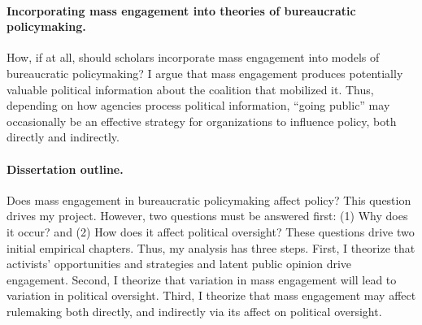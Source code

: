 \documentclass{article}
\begin{document}
\paragraph{Incorporating mass engagement into theories of bureaucratic policymaking.}
How, if at all, should scholars incorporate mass engagement into models of bureaucratic policymaking? 
I argue that mass engagement produces potentially valuable political information about the coalition that mobilized it.
Thus, depending on how agencies process political information, ``going public'' may occasionally be an effective strategy for organizations to influence policy, both directly and indirectly.

\paragraph{Dissertation outline.}
Does mass engagement in bureaucratic policymaking affect policy? This question drives my project. However, two questions must be answered first: (1) Why does it occur? and (2) How does it affect political oversight? These questions drive two initial empirical chapters. Thus, my analysis has three steps.
First, I theorize that activists' opportunities and strategies and latent public opinion drive engagement. Second, I theorize that variation in mass engagement will lead to variation in political oversight. Third, I theorize that mass engagement may affect rulemaking both directly, and indirectly via its affect on political oversight.


\end{document}
